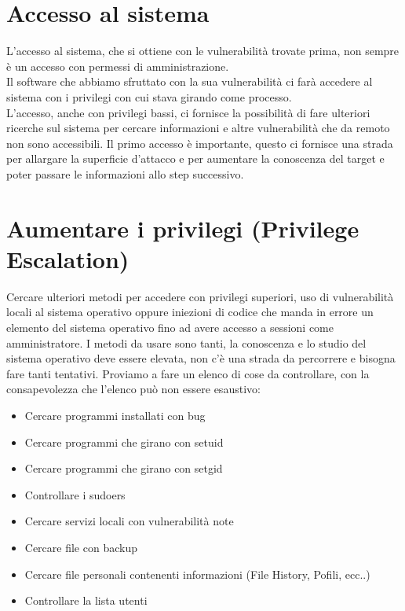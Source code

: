\documentclass[a4paper,12pt]{article}
\begin{document}
\section{ Accesso al sistema }

L'accesso al sistema, che si ottiene con le vulnerabilità trovate prima, non sempre è un accesso con permessi di amministrazione.\\
Il software che abbiamo sfruttato con la sua vulnerabilità ci farà accedere al sistema con i privilegi con cui stava girando come processo.\\
L'accesso, anche con privilegi bassi, ci fornisce la possibilità di fare ulteriori ricerche sul sistema per cercare informazioni e altre vulnerabilità che da remoto non sono accessibili.
Il primo accesso è importante, questo ci fornisce una strada per allargare la superficie d'attacco e per aumentare la conoscenza del target e poter passare le informazioni allo step successivo.


\section{  Aumentare i privilegi (Privilege Escalation) }

Cercare ulteriori metodi per accedere con privilegi superiori, uso di vulnerabilità locali  al sistema operativo oppure iniezioni di codice che manda in  errore un elemento del sistema operativo fino ad avere accesso a sessioni come amministratore. I metodi da usare sono tanti, la conoscenza e lo studio del sistema operativo deve essere elevata, non c'è una strada da percorrere e bisogna fare tanti tentativi. 
Proviamo a fare un elenco di cose da controllare, con la consapevolezza che l'elenco può non essere esaustivo:\\
\begin{itemize}
   
  \item Cercare programmi installati con bug
  \item Cercare programmi che girano con setuid
  \item Cercare programmi che girano con setgid
  \item Controllare i sudoers
  \item Cercare servizi locali con vulnerabilità note
  \item Cercare file con backup 
  \item Cercare file personali contenenti informazioni (File History, Pofili, ecc..)
  \item Controllare la lista utenti
  
\end{itemize}
\end{document}
